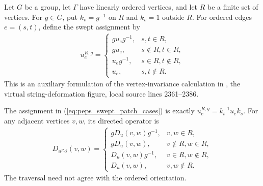 \begin{definition}%
    \label{def:peps_regular_swept_patch}
    \leanok
    Let $G$ be a group, let $\Gamma$ have linearly ordered vertices,
    and let $R$ be a finite set of vertices. For $g\in G$, put
    $k_v=g^{-1}$ on $R$ and $k_v=1$ outside $R$.
    For ordered edges $e=(s,t)$, define the swept assignment by
    \begin{align}
        u_e^{R,g}=
        \begin{cases}
            gu_eg^{-1}, & s,t\in R,          \\
            gu_e,       & s\notin R, t\in R, \\
            u_eg^{-1},  & s\in R, t\notin R, \\
            u_e,        & s,t\notin R.
        \end{cases}
        \label{eq:peps_swept_patch_cases}
    \end{align}
    This is an auxiliary formulation of the vertex-invariance calculation
    in \cite[Section~6.6]{Schuch2010PEPS}, the virtual string-deformation
    figure, local source lines 2361--2386.
\end{definition}

\begin{lemma}%
    \label{thm:peps_regular_swept_patch_transport}
    \leanok
    The assignment in (\ref{eq:peps_swept_patch_cases}) is exactly
    $u_e^{R,g}=k_t^{-1}u_ek_s$.
    For any adjacent vertices $v,w$, its directed operator is
    \begin{align}
        D_{u^{R,g}}(v,w)=
        \begin{cases}
            gD_u(v,w)g^{-1}, & v,w\in R,          \\
            gD_u(v,w),       & v\notin R, w\in R, \\
            D_u(v,w)g^{-1},  & v\in R, w\notin R, \\
            D_u(v,w),        & v,w\notin R.
        \end{cases}
        \label{eq:peps_swept_directed_cases}
    \end{align}
    The traversal need not agree with the ordered orientation.
\end{lemma}

